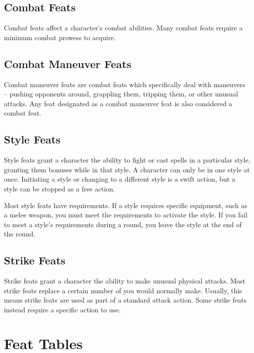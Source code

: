 \subsection{Combat Feats}
Combat feats affect a character's combat abilities.
Many combat feats require a minimum combat prowess to acquire.

\subsection{Combat Maneuver Feats}
Combat maneuver feats are combat feats which specifically deal with maneuvers -- pushing opponents around, grappling them, tripping them, or other unusual attacks.
Any feat designated as a combat maneuver feat is also considered a combat feat.

\subsection{Style Feats}
Style feats grant a character the ability to fight or cast spells in a particular style, granting them bonuses while in that style.
A character can only be in one style at once.
Initiating a style or changing to a different style is a swift action, but a style can be stopped as a free action.

Most style feats have requirements.
If a style requires specific equipment, such as a melee weapon, you must meet the requirements to activate the style.
If you fail to meet a style's requirements during a round, you leave the style at the end of the round.

\subsection{Strike Feats}\label{Strike Feats}
Strike feats grant a character the ability to make unusual physical attacks.
Most strike feats replace a certain number of  you would normally make.
Usually, this means strike feats are used as part of a standard attack action.
Some strike feats instead require a specific action to use.

\section{Feat Tables}
\onecolumn

